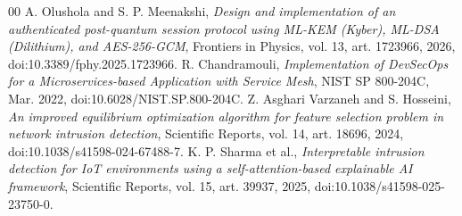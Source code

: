 \documentclass[conference,a4paper]{IEEEtran}
\begin{document}
\begin{thebibliography}{00}
 A. Olushola and S. P. Meenakshi, \emph{Design and implementation of an authenticated post-quantum session protocol using ML-KEM (Kyber), ML-DSA (Dilithium), and AES-256-GCM}, Frontiers in Physics, vol. 13, art. 1723966, 2026, doi:10.3389/fphy.2025.1723966.
 R. Chandramouli, \emph{Implementation of DevSecOps for a Microservices-based Application with Service Mesh}, NIST SP 800-204C, Mar. 2022, doi:10.6028/NIST.SP.800-204C.
 Z. Asghari Varzaneh and S. Hosseini, \emph{An improved equilibrium optimization algorithm for feature selection problem in network intrusion detection}, Scientific Reports, vol. 14, art. 18696, 2024, doi:10.1038/s41598-024-67488-7.
 K. P. Sharma et al., \emph{Interpretable intrusion detection for IoT environments using a self-attention-based explainable AI framework}, Scientific Reports, vol. 15, art. 39937, 2025, doi:10.1038/s41598-025-23750-0.
\end{thebibliography}
\end{document}
